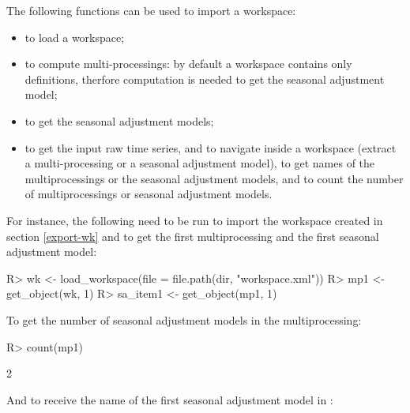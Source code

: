 \documentclass[article]{jss}
\providecommand{\tightlist}{%
  \setlength{\itemsep}{0pt}\setlength{\parskip}{0pt}}
\begin{document}
The following functions can be used to import a workspace:

\begin{itemize}
\tightlist
\item
   to load a workspace;\\
\item
   to compute multi-processings: by default a workspace
  contains only definitions, therfore computation is needed to get the
  seasonal adjustment model;\\
\item
   to get the seasonal adjustment models;\\
\item
   to get the input raw time series, 
  and  to navigate inside a workspace (extract a
  multi-processing or a seasonal adjustment model),  to
  get names of the multiprocessings or the seasonal adjustment models,
  and  to count the number of multiprocessings or seasonal
  adjustment models.
\end{itemize}

For instance, the following need to be run to import the workspace
created in section \ref{export-wk} and to get the first multiprocessing
and the first seasonal adjustment model:

\begin{CodeChunk}

\begin{CodeInput}
R> wk <- load_workspace(file =  file.path(dir, "workspace.xml"))
R> mp1 <- get_object(wk, 1)
R> sa_item1 <- get_object(mp1, 1)
\end{CodeInput}
\end{CodeChunk}

To get the number of seasonal adjustment models in the multiprocessing:

\begin{CodeChunk}

\begin{CodeInput}
R> count(mp1)
\end{CodeInput}

\begin{CodeOutput}
[1] 2
\end{CodeOutput}
\end{CodeChunk}

And to receive the name of the first seasonal adjustment model in
:
\end{document}
